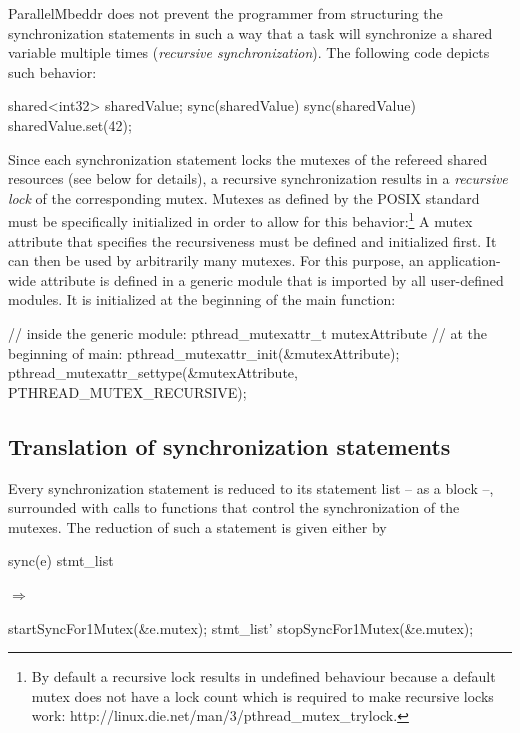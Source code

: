 ParallelMbeddr does not prevent the programmer from structuring the synchronization statements in such a way that a task will synchronize a shared variable multiple times (\textit{recursive synchronization}). The following code depicts such behavior:
\begin{ccode}
shared<int32> sharedValue;
sync(sharedValue) {
  sync(sharedValue) {
    sharedValue.set(42);
  }
}
\end{ccode}
Since each synchronization statement locks the mutexes of the refereed shared resources (see below for details), a recursive synchronization results in a \textit{recursive lock} of the corresponding mutex. Mutexes as defined by the POSIX standard must be specifically initialized in order to allow for this behavior:\footnote{By default a recursive lock results in undefined behaviour because a default mutex does not have a lock count which is required to make recursive locks work: http://linux.die.net/man/3/pthread\_mutex\_trylock.} A mutex attribute that specifies the recursiveness must be defined and initialized first. It can then be used by arbitrarily many mutexes. For this purpose, an application-wide attribute is defined in a generic module that is imported by all user-defined modules. It is initialized at the beginning of the main function:
\begin{ccode}
// inside the generic module:
pthread_mutexattr_t mutexAttribute
// at the beginning of main:
pthread_mutexattr_init(&mutexAttribute);
pthread_mutexattr_settype(&mutexAttribute, PTHREAD_MUTEX_RECURSIVE);
\end{ccode}

\subsection{Translation of synchronization statements}
Every synchronization statement is reduced to its statement list -- as a block --, surrounded with calls to functions that control the synchronization of the mutexes. The reduction of such a statement is given either by

\begin{center}
\begin{minipage}{0.3\textwidth}
\begin{ccode}
sync(e) stmt_list
\end{ccode}
\end{minipage}
\qquad$\Longrightarrow$\qquad\qquad\qquad
\begin{minipage}{0.4\textwidth}
\begin{ccode}
startSyncFor1Mutex(&e.mutex);
stmt_list'
stopSyncFor1Mutex(&e.mutex);
\end{ccode}
\end{minipage}
\end{center}

